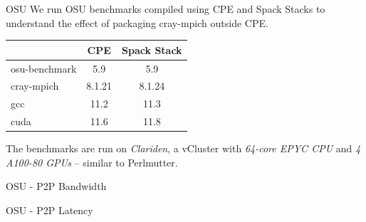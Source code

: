 \documentclass[aspectratio=43]{beamer}
\begin{document}

\begin{frame}[fragile]{OSU}
    We run OSU benchmarks compiled using CPE and Spack Stacks to understand the effect of packaging cray-mpich outside CPE.
\begin{center}
    \begin{tabular}{l |c  c }
                      & CPE   & Spack Stack \\
          \hline
        osu-benchmark & 5.9   & 5.9       \\
        cray-mpich    & 8.1.21& 8.1.24    \\
        gcc           & 11.2  & 11.3      \\
        cuda          & 11.6  & 11.8      \\
    \end{tabular}
\end{center}

    The benchmarks are run on \emph{Clariden}, a vCluster with \emph{64-core EPYC CPU} and  \emph{4 A100-80 GPUs} -- similar to Perlmutter.

\end{frame}

\begin{frame}[fragile]{OSU - P2P Bandwidth}
    \begin{center}
        
    \end{center}
\end{frame}

\begin{frame}[fragile]{OSU - P2P Latency}
    \begin{center}
        
    \end{center}
\end{frame}
\end{document}
